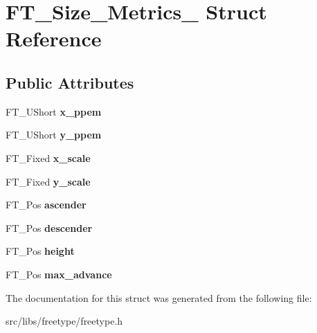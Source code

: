 \hypertarget{struct_f_t___size___metrics__}{
\section{FT\_\-Size\_\-Metrics\_\- Struct Reference}
\label{struct_f_t___size___metrics__}
}
\subsection*{Public Attributes}
\begin{DoxyCompactItemize}
\item 
\hypertarget{struct_f_t___size___metrics___abb42b175a3450e9d8b84483f166d6c8a}{
FT\_\-UShort {\bfseries x\_\-ppem}}
\label{struct_f_t___size___metrics___abb42b175a3450e9d8b84483f166d6c8a}

\item 
\hypertarget{struct_f_t___size___metrics___abcdb70cb9e39a74679bc39c07f3275f7}{
FT\_\-UShort {\bfseries y\_\-ppem}}
\label{struct_f_t___size___metrics___abcdb70cb9e39a74679bc39c07f3275f7}

\item 
\hypertarget{struct_f_t___size___metrics___a5e92028bb9881e107a6fb75d557eaff1}{
FT\_\-Fixed {\bfseries x\_\-scale}}
\label{struct_f_t___size___metrics___a5e92028bb9881e107a6fb75d557eaff1}

\item 
\hypertarget{struct_f_t___size___metrics___a1f8b1cb3538b9920127f721dd061379d}{
FT\_\-Fixed {\bfseries y\_\-scale}}
\label{struct_f_t___size___metrics___a1f8b1cb3538b9920127f721dd061379d}

\item 
\hypertarget{struct_f_t___size___metrics___ab5fde60a2661d7b774f61c264a2a6070}{
FT\_\-Pos {\bfseries ascender}}
\label{struct_f_t___size___metrics___ab5fde60a2661d7b774f61c264a2a6070}

\item 
\hypertarget{struct_f_t___size___metrics___a9b2ca3a4391803e8721ed99eb9953d52}{
FT\_\-Pos {\bfseries descender}}
\label{struct_f_t___size___metrics___a9b2ca3a4391803e8721ed99eb9953d52}

\item 
\hypertarget{struct_f_t___size___metrics___ae3361e264fb8a9e669f118bdb244439b}{
FT\_\-Pos {\bfseries height}}
\label{struct_f_t___size___metrics___ae3361e264fb8a9e669f118bdb244439b}

\item 
\hypertarget{struct_f_t___size___metrics___ac315a7a834ac1a57c7169ce021718958}{
FT\_\-Pos {\bfseries max\_\-advance}}
\label{struct_f_t___size___metrics___ac315a7a834ac1a57c7169ce021718958}

\end{DoxyCompactItemize}


The documentation for this struct was generated from the following file:\begin{DoxyCompactItemize}
\item 
src/libs/freetype/freetype.h\end{DoxyCompactItemize}
